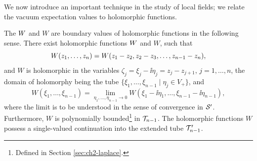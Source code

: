 We now introduce an important technique in the study of local fields; we
relate the vacuum expectation values to holomorphic functions.

\begin{theorem}\label{thm:ch3-5-holomorphic-boundary-values}
The $W$ and $W$ are boundary values of holomorphic functions in the
following sense. There exist holomorphic functions $W$ and $W$,
such that
\begin{equation*}
 W(z_1,\ldots,z_n)
 =W(z_1-z_2,z_2-z_3,\ldots,z_{n-1}-z_n),
\end{equation*}
and $W$ is holomorphic in the variables
$\zeta_j=\xi_j-\ii\eta_j=z_j-z_{j+1}$, $j=1,\ldots,n$, the domain of
holomorphy being the tube
$\{\xi_1,\ldots,\xi_{n-1}\mid\eta_j\in V_+\}$, and
\begin{equation*}
 W(\xi_1,\ldots,\xi_{n-1})
 =\lim_{\eta_1,\ldots,\eta_{n-1}\to0}
 W(\xi_1-\ii\eta_1,\ldots,\xi_{n-1}-\ii\eta_{n-1}),
\end{equation*}
where the limit is to be understood in the sense of convergence in
$\mathcal{S}'$. Furthermore, $W$ is polynomially bounded\footnote{Defined in
Section \ref{sec:ch2-laplace}.} in $\mathcal{T}_{n-1}$. The holomorphic functions $W$ possess a
single-valued continuation into the extended tube $\mathcal{T}^{\prime}_{n-1}$.
\end{theorem}


